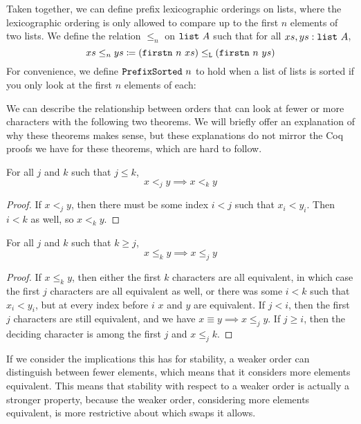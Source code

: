 \documentclass[sigplan,10pt,anonymous,review]{thesis}
\begin{document}
Taken together, we can define prefix lexicographic orderings on lists,
where the lexicographic ordering is only allowed to compare up to the
first $n$ elements of two lists. We define the relation $\le_n$ on
$\texttt{list}~A$ such that for all $xs, ys : \texttt{list}~A$,
\begin{equation*}
  xs \le_n ys \coloneqq (\texttt{firstn}~n~xs) \le_{\texttt{L}} (\texttt{firstn}~n~ys)
\end{equation*}
For convenience, we define $\texttt{PrefixSorted}~n$ to hold when a list
of lists is sorted if you only look at the first $n$ elements of each:


We can describe the relationship between orders that can look at fewer
or more characters with the following two theorems. We will briefly
offer an explanation of why these theorems makes sense, but these
explanations do not mirror the Coq proofs we have for these theorems,
which are hard to follow.

\begin{theorem}
  For all $j$ and $k$ such that $j \le k$,
  \begin{equation*}
    x <_j y \implies x <_k y
  \end{equation*}
\end{theorem}
\begin{proof}
  If $x <_j y$, then there must be some index $i < j$ such that $x_i <
  y_i$. Then $i < k$ as well, so $x <_k y$.
\end{proof}

\begin{theorem}
  For all $j$ and $k$ such that $k \ge j$,
  \begin{equation*}
    x \le_k y \implies x \le_j y
  \end{equation*}
\end{theorem}
\begin{proof}
  If $x \le_k y$, then either the first $k$ characters are all
  equivalent, in which case the first $j$ characters are all
  equivalent as well, or there was some $i < k$ such that $x_i < y_i$,
  but at every index before $i$ $x$ and $y$ are equivalent. If $j <
  i$, then the first $j$ characters are still equivalent, and we have
  $x \equiv y \implies x \le_j y$. If $j \ge i$, then the deciding character is
  among the first $j$ and $x \le_j k$.
\end{proof}

If we consider the implications this has for stability, a weaker order
can distinguish between fewer elements, which means that it considers
more elements equivalent. This means that stability with respect to a
weaker order is actually a stronger property, because the weaker
order, considering more elements equivalent, is more restrictive about
which swaps it allows.
\end{document}
